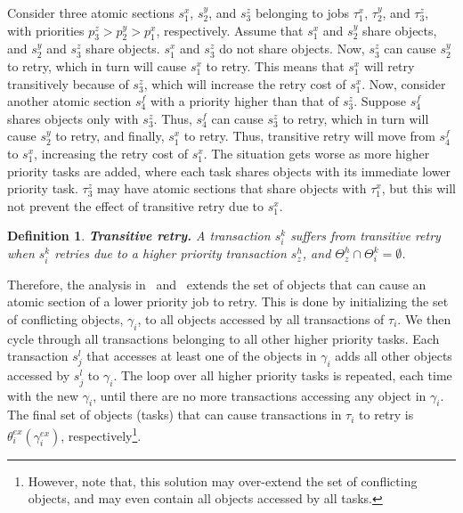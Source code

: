\documentclass[conference]{IEEEtran}
\newtheorem{mydef}{Definition}
\begin{document}
Consider three atomic sections $s_{1}^{x}$, $s_{2}^{y}$, 
and $s_{3}^{z}$ belonging to jobs $\tau_{1}^{x}$, $\tau_{2}^{y}$, 
and $\tau_{3}^{z}$, with priorities $p_{3}^{z}>p_{2}^{y}>p_{1}^{x}$, respectively. 
Assume that $s_{1}^{x}$ and $s_{2}^{y}$ share objects, and $s_{2}^{y}$ and $s_{3}^{z}$ share objects. $s_{1}^{x}$ and $s_{3}^{z}$ do not share objects.
Now, $s_{3}^{z}$ can cause $s_{2}^{y}$ to retry, which in turn will cause $s_{1}^{x}$ to retry. This means that $s_{1}^{x}$ will retry transitively
because of $s_{3}^{z}$, which will increase the retry cost of $s_{1}^{x}$. Now, consider another atomic section $s_4^f$ with a priority higher than that of $s_3^z$. Suppose $s_4^f$ shares objects only with $s_3^z$. Thus, $s_4^f$ can cause $s_3^z$ to retry, which in turn will cause $s_2^y$ to retry, and finally, $s_1^x$ to retry. Thus, transitive retry will move from $s_{4}^{f}$ to $s_{1}^{x}$, increasing the retry cost of $s_{1}^{x}$. The situation gets worse as more higher priority tasks are added, where each task shares objects with its immediate lower priority task. $\tau_{3}^{z}$ may have atomic sections that share objects with $\tau_{1}^{x}$,
but this will not prevent the effect of transitive retry due to $s_{1}^{x}$.

\begin{mydef}
\label{defn:trans-retry}
\textbf{Transitive retry.} A transaction $s_{i}^{k}$ suffers from
transitive retry when $s_i^k$ retries due to a higher priority transaction $s_z^h$, and $\Theta_z^h \cap \Theta_i^k=\emptyset$.
\end{mydef}

Therefore, the analysis in~\cite{stmconcurrencycontrol:emsoft11} and~\cite{lcmdac2012} extends the set of objects that can cause an atomic section of a lower priority job to retry.  This is done by initializing the set of conflicting objects, $\gamma_i$, to all objects accessed by all transactions of $\tau_i$. We then cycle through all transactions belonging to all other higher priority tasks. Each transaction $s_j^l$ that accesses at least one of the objects in $\gamma_i$ adds all other objects accessed by $s_j^l$ to $\gamma_i$. The loop over all higher priority tasks is repeated, each time with the new $\gamma_i$, until there are no more transactions accessing any object in $\gamma_i$. The final set of objects (tasks) that can cause transactions in $\tau_i$ to retry is $\theta_i^{ex}(\gamma_i^{ex})$, respectively\footnote{However, note that, this solution may over-extend the set of conflicting objects, and may even contain all objects accessed by all tasks.}. 
\end{document}
